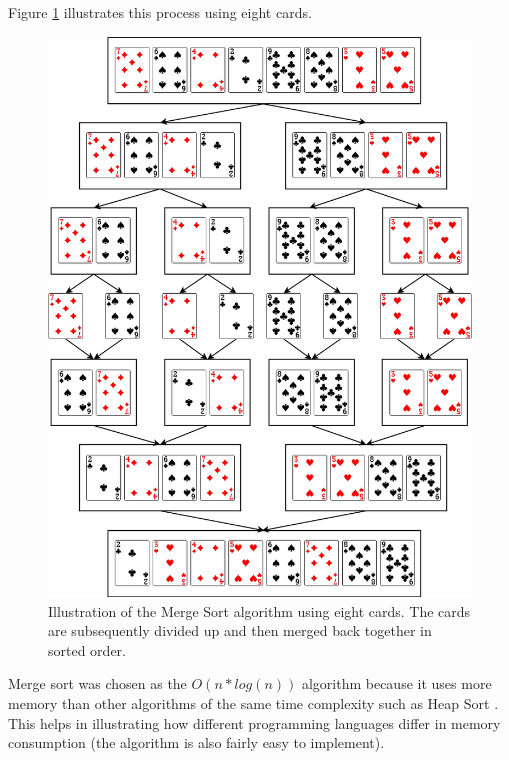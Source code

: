 Figure \ref{fig:mergesort} illustrates this process using eight cards.

\begin{figure}[h]
	\centering
	\includegraphics[width=0.9\linewidth]{chapters/media/mergesort4.png}
	\caption{Illustration of the Merge Sort algorithm using eight cards. The cards are subsequently divided up and then merged back together in sorted order.}
	\label{fig:mergesort}
\end{figure}

Merge sort was chosen as the $O(n * log(n))$ algorithm because it uses more memory than other algorithms of the same time complexity such as Heap Sort \cite{Mergesort}. This helps in illustrating how different programming languages differ in memory consumption (the algorithm is also fairly easy to implement). 





